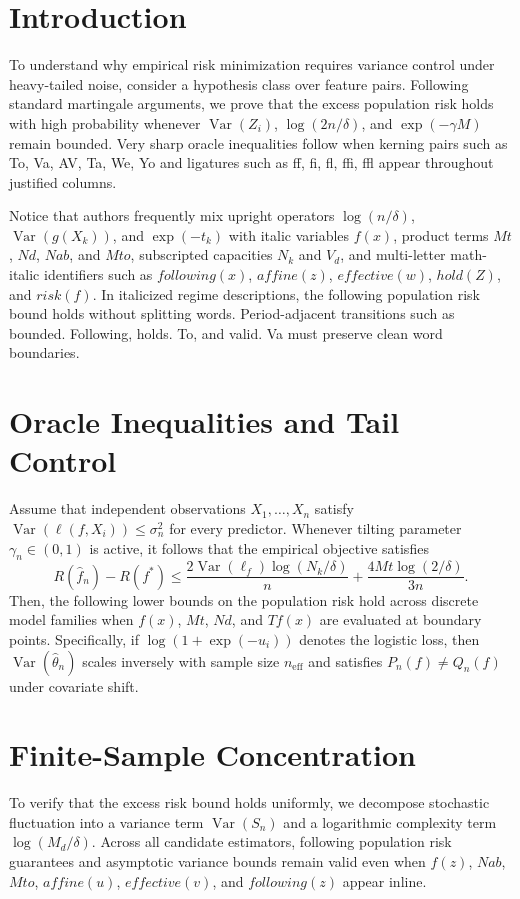 \documentclass[10pt,twocolumn]{article}
\newcommand{\lmitalic}[1]{{\lmit #1}}
\begin{document}
\section{Introduction}
To understand why empirical risk minimization requires variance control under heavy-tailed noise, consider a hypothesis class over feature pairs. Following standard martingale arguments, we prove that the excess population risk holds with high probability whenever $\operatorname{Var}(Z_i)$, $\log(2n/\delta)$, and $\exp(-\gamma M)$ remain bounded. Very sharp oracle inequalities follow when kerning pairs such as To, Va, AV, Ta, We, Yo and ligatures such as ff, fi, fl, ffi, ffl appear throughout justified columns.

Notice that authors frequently mix upright operators $\log(n/\delta)$, $\operatorname{Var}(g(X_k))$, and $\exp(-t_k)$ with italic variables $f(x)$, product terms $Mt$, $Nd$, $Nab$, and $Mto$, subscripted capacities $N_k$ and $V_d$, and multi-letter math-italic identifiers such as $following(x)$, $affine(z)$, $effective(w)$, $hold(Z)$, and $risk(f)$. In \lmitalic{italicized regime descriptions, the following population risk bound holds without splitting words}. Period-adjacent transitions such as bounded. Following, holds. To, and valid. Va must preserve clean word boundaries.

\section{Oracle Inequalities and Tail Control}
Assume that independent observations $X_1, \dots, X_n$ satisfy $\operatorname{Var}(\ell(f, X_i)) \le \sigma_n^2$ for every predictor. Whenever tilting parameter $\gamma_n \in (0, 1)$ is active, it follows that the empirical objective satisfies
\[
R(\hat{f}_n) - R(f^*) \le \frac{2 \operatorname{Var}(\ell_f) \log(N_k/\delta)}{n} + \frac{4 M t \log(2/\delta)}{3 n}.
\]
Then, the following lower bounds on the population risk hold across discrete model families when $f(x)$, $Mt$, $Nd$, and $Tf(x)$ are evaluated at boundary points. Specifically, if $\log(1 + \exp(-u_i))$ denotes the logistic loss, then $\operatorname{Var}(\hat{\theta}_n)$ scales inversely with sample size $n_{\mathrm{eff}}$ and satisfies $P_n(f) \neq Q_n(f)$ under covariate shift.

\newpage

\section{Finite-Sample Concentration}
To verify that the excess risk bound holds uniformly, we decompose stochastic fluctuation into a variance term $\operatorname{Var}(S_n)$ and a logarithmic complexity term $\log(M_d/\delta)$. Across all candidate estimators, \lmitalic{following population risk guarantees and asymptotic variance bounds} remain valid even when $f(z)$, $Nab$, $Mto$, $affine(u)$, $effective(v)$, and $following(z)$ appear inline.
\end{document}
